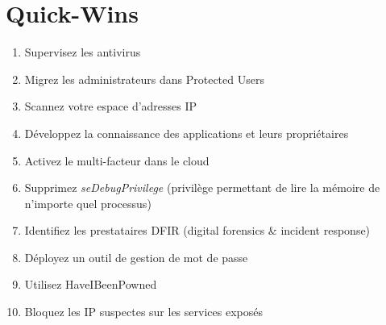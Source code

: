 \documentclass[a4paper]{article}
\begin{document}
\section{Quick-Wins}
\begin{enumerate}
  \item Supervisez les antivirus
  \item Migrez les administrateurs dans Protected Users
  \item Scannez votre espace d'adresses IP 
  \item Développez la connaissance des applications et leurs propriétaires
  \item Activez le multi-facteur dans le cloud
  \item Supprimez \emph{seDebugPrivilege} (privilège permettant de lire la mémoire de n'importe quel processus)
  \item Identifiez les prestataires DFIR (digital forensics \& incident response)
  \item Déployez un outil de gestion de mot de passe
  \item Utilisez HaveIBeenPowned
  \item Bloquez les IP suspectes sur les services exposés
\end{enumerate}
\end{document}
